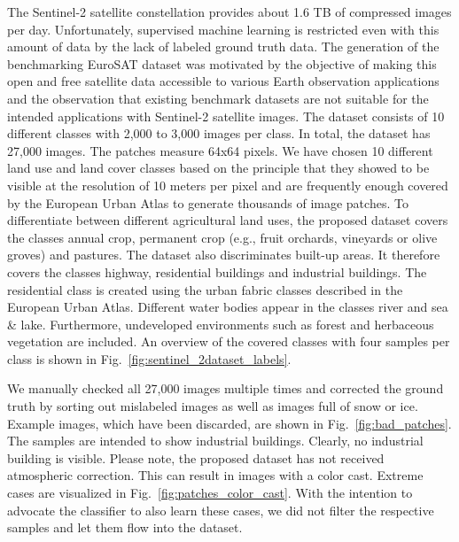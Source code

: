 \documentclass[journal]{IEEEtran}
\begin{document}
The Sentinel-2 satellite constellation provides about 1.6 TB of compressed images per day. Unfortunately, supervised machine learning is restricted even with this amount of data by the lack of labeled ground truth data. The generation of the benchmarking EuroSAT dataset was motivated by the objective of making this open and free satellite data accessible to various Earth observation applications and the observation that existing benchmark datasets are not suitable for the intended applications with Sentinel-2 satellite images.
The dataset consists of 10 different classes with 2,000 to 3,000 images per class. In total, the dataset has 27,000 images. The patches measure 64x64 pixels. We have chosen 10 different land use and land cover classes based on the principle that they showed to be visible at the resolution of 10 meters per pixel and are frequently enough covered by the European Urban Atlas to generate thousands of image patches. To differentiate between different agricultural land uses, the proposed dataset covers the classes annual crop, permanent crop (e.g., fruit orchards, vineyards or olive groves) and pastures. The dataset also discriminates built-up areas. It therefore covers the classes highway, residential buildings and industrial buildings. The residential class is created using the urban fabric classes described in the European Urban Atlas. Different water bodies appear in the classes river and sea \& lake. Furthermore, undeveloped environments such as forest and herbaceous vegetation are included. An overview of the covered classes with four samples per class is shown in Fig.~\ref{fig:sentinel_2dataset_labels}. %

We manually checked all 27,000 images multiple times and corrected the ground truth by sorting out mislabeled images as well as images full of snow or ice. Example images, which have been discarded, are shown in Fig.~\ref{fig:bad_patches}. The samples are intended to show industrial buildings. Clearly, no industrial building is visible. Please note, the proposed dataset has not received atmospheric correction. This can result in images with a color cast. Extreme cases are visualized in Fig.~\ref{fig:patches_color_cast}. With the intention to advocate the classifier to also learn these cases, we did not filter the respective samples and let them flow into the dataset.
\end{document}
